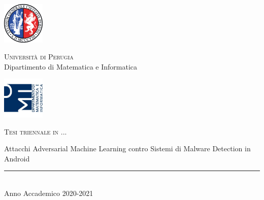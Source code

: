 \thispagestyle{empty} %

	\noindent %
	\includegraphics[width=0.15\textwidth]{imgs/unipg.png}
	\begin{minipage}[b]{0.7\textwidth}
		\centering
		{\Large \textsc{Universit{\`a} di Perugia}}\\
		\vspace{0.4 em}
		{\large Dipartimento di Matematica e Informatica}
		\vspace{0.6 em}
	\end{minipage}%
	\includegraphics[width=0.15\textwidth]{imgs/dmi.png}
	
	\vspace{5 em}

	\begin{center}
		
		{\large \textsc{Tesi triennale in ...}}
		\vspace{8 em}
		
		{\Huge Attacchi Adversarial Machine Learning contro Sistemi di Malware Detection in Android \par} %
		\vspace{10 em}
		
	
		\vspace{6 em}
		\vfill
		
		\rule{380pt}{.4pt}\\
		\vspace{0.4 em}
		\large{Anno Accademico 2020-2021}
		
	\end{center}
